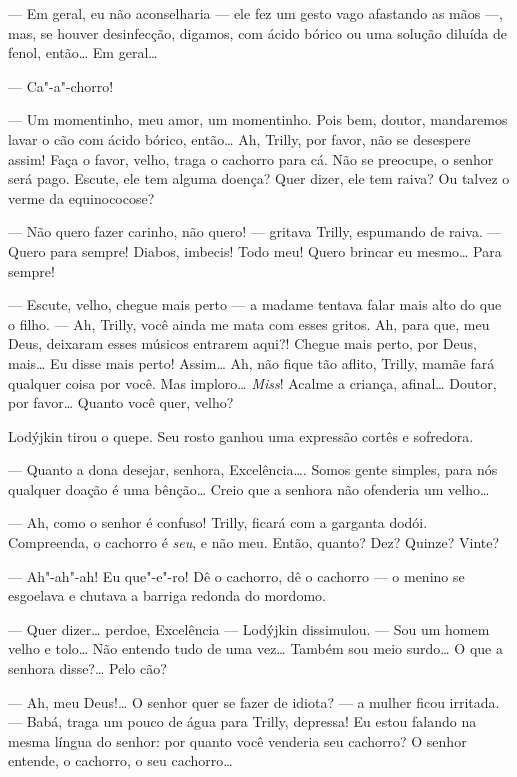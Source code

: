 --- Em geral, eu não aconselharia --- ele fez um gesto vago afastando as
mãos ---, mas, se houver desinfecção, digamos, com ácido bórico ou uma
solução diluída de fenol, então\ldots{} Em geral\ldots{}

--- Ca"-a"-chorro!

--- Um momentinho, meu amor, um momentinho. Pois bem, doutor, mandaremos
lavar o cão com ácido bórico, então\ldots{} Ah, Trilly, por favor, não se
desespere assim! Faça o favor, velho, traga o cachorro para cá. Não se
preocupe, o senhor será pago. Escute, ele tem alguma doença? Quer dizer,
ele tem raiva? Ou talvez o verme da equinococose?

--- Não quero fazer carinho, não quero! --- gritava Trilly, espumando de
raiva. --- Quero para sempre! Diabos, imbecis! Todo meu! Quero brincar
eu mesmo\ldots{} Para sempre!

--- Escute, velho, chegue mais perto --- a madame tentava falar mais
alto do que o filho. --- Ah, Trilly, você ainda me mata com esses
gritos. Ah, para que, meu Deus, deixaram esses músicos entrarem aqui?!
Chegue mais perto, por Deus, mais\ldots{} Eu disse mais perto! Assim\ldots{} Ah,
não fique tão aflito, Trilly, mamãe fará qualquer coisa por você. Mas
imploro\ldots{} \emph{Miss}! Acalme a criança, afinal\ldots{} Doutor, por favor\ldots{}
Quanto você quer, velho?

Lodýjkin tirou o quepe. Seu rosto ganhou uma expressão cortês e
sofredora.

--- Quanto a dona desejar, senhora, Excelência\ldots{}. Somos gente simples,
para nós qualquer doação é uma bênção\ldots{} Creio que a senhora não
ofenderia um velho\ldots{}

--- Ah, como o senhor é confuso! Trilly, ficará com a garganta dodói.
Compreenda, o cachorro é \emph{seu}, e não meu. Então, quanto? Dez?
Quinze? Vinte?

--- Ah"-ah"-ah! Eu que"-e"-ro! Dê o cachorro, dê o cachorro --- o menino se
esgoelava e chutava a barriga redonda do mordomo.

--- Quer dizer\ldots{} perdoe, Excelência --- Lodýjkin dissimulou. --- Sou um
homem velho e tolo\ldots{} Não entendo tudo de uma vez\ldots{} Também sou meio
surdo\ldots{} O que a senhora disse?\ldots{} Pelo cão?

--- Ah, meu Deus!\ldots{} O senhor quer se fazer de idiota? --- a mulher
ficou irritada. --- Babá, traga um pouco de água para Trilly, depressa!
Eu estou falando na mesma língua do senhor: por quanto você venderia seu
cachorro? O senhor entende, o cachorro, o seu cachorro\ldots{}

